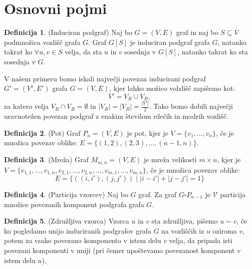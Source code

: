 \documentclass[a4paper, 11pt]{article}
\theoremstyle{definition}
\newtheorem{definicija}{Definicija}
\theoremstyle{definition}
\begin{document}
    \section{Osnovni pojmi}
    
    \begin{definicija} (Induciran podgraf)
        Naj bo $G=(V,E)$ graf in naj bo $S \subseteq V$ podmnožica vozlišč grafa $G$. 
        Graf $G[S]$ je induciran podgraf grafa $G$, natanko takrat ko $\forall u, v \in S$ velja,
        da sta $u$ in $v$ sosednja v $G[S]$, natanko takrat ko sta sosednja v $G$.
    \end{definicija}
    
    V našem primeru bomo iskali največji povezan inducirani podgraf \\ $G' = (V', E')$ grafa $G = (V, E)$, kjer lahko možico volzlišč
    zapišemo kot: 
        $$ V' = V_{R} \cup V_{B},$$
    za katero velja $ V_{R} \cap  V_{B} = \emptyset $ in $|V_{R}| = |V_{B}| = \frac{|V'|}{2}$. Tako bomo dobili
    največji uravnotežen povezan podgraf z enakim številom rdečih in modrih vozlišč.    

    \begin{definicija} (Pot) Graf $P_n=(V,E)$ je pot, kjer je
        $V=\{ v_1,...,v_n \}$, če je množica povezav oblike:
        $E = \{ (1, 2),(2, 3),...,(n-1, n) \}$.
    \end{definicija}

    \begin{definicija} 
    (Mreža) Graf $M_{m,n}=(V,E)$ je mreža velikosti $m \times n$, 
    kjer je $V=\{ v_{1,1},...,v_{1,n},v_{2,1},...,v_{2,n},...,v_{m,1},...,v_{m,n} \}$, če je množica povezav oblike:
        $$
        E = \{ ((i, i'),(j, j')) \mid |i-i'| + |j-j'| =1  \}
        $$
    \end{definicija}

    \begin{definicija}
    (Particija vzorcev)  
    Naj bo $G$ graf. 
    Za graf $G \square P_{n-1}$ je $\mathcal{V}$ particija množice povezanih komponent podgrafa grafa $G$.  
    \end{definicija}

    \begin{definicija}
    (Združljiva vzorca) 
    Vzorca $u$ in $v$ sta združljiva, pišemo \newline $u \sim v$, če ko pogledamo unijo
    induciranih podgrafov grafa $G$ na vozliščih iz $u$ 
    oziroma $v$, potem za vsako povezano komponento v istem delu $v$ velja, da pripada isti povezani komponenti v uniji (pri čemer upoštevamo povezanost komponent v istem delu $u$).   
    \end{definicija}
\end{document}
